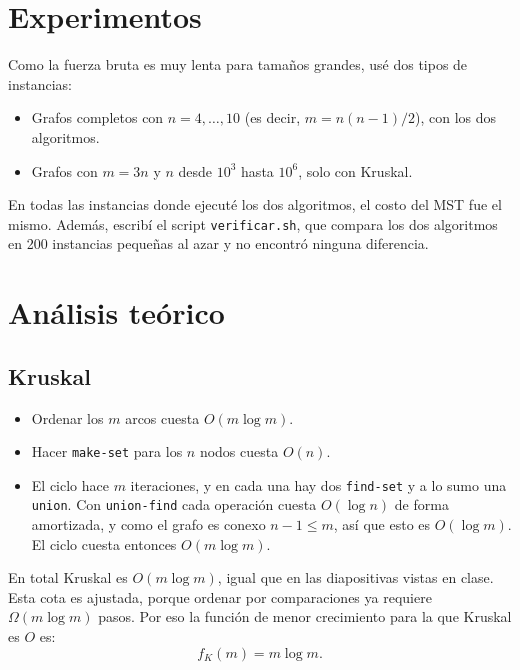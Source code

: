 \documentclass[11pt,a4paper]{article}
\begin{document}
\section{Experimentos}
Como la fuerza bruta es muy lenta para tamaños grandes, usé dos tipos de instancias:
\begin{itemize}
  \item Grafos completos con $n=4,\dots,10$ (es decir, $m=n(n-1)/2$), con los dos algoritmos.
  \item Grafos con $m=3n$ y $n$ desde $10^3$ hasta $10^6$, solo con Kruskal.
\end{itemize}
En todas las instancias donde ejecuté los dos algoritmos, el costo del MST fue el mismo. Además, escribí el script \texttt{verificar.sh}, que compara los dos algoritmos en 200 instancias pequeñas al azar y no encontró ninguna diferencia.

\begin{table}[H]
\centering

\caption{Fuerza bruta en grafos completos, donde la última columna son las instrucciones de Kruskal en la misma instancia.}
\end{table}

\begin{table}[H]
\centering

\caption{Algoritmo de Kruskal en grafos con $m=3n$.}
\end{table}

\section{Análisis teórico}
\subsection{Kruskal}
\begin{itemize}
  \item Ordenar los $m$ arcos cuesta $O(m\log m)$.
  \item Hacer \texttt{make-set} para los $n$ nodos cuesta $O(n)$.
  \item El ciclo hace $m$ iteraciones, y en cada una hay dos \texttt{find-set} y a lo sumo una \texttt{union}. Con \texttt{union-find} cada operación cuesta $O(\log n)$ de forma amortizada, y como el grafo es conexo $n-1\le m$, así que esto es $O(\log m)$. El ciclo cuesta entonces $O(m\log m)$.
\end{itemize}
En total Kruskal es $O(m\log m)$, igual que en las diapositivas vistas en clase. Esta cota es ajustada, porque ordenar por comparaciones ya requiere $\Omega(m\log m)$ pasos. Por eso la función de menor crecimiento para la que Kruskal es $O$ es:
\[
f_K(m)=m\log m .
\]
\end{document}

